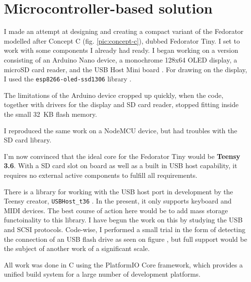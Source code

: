 \chapter{Microcontroller-based solution}
    
    I made an attempt at designing and creating a compact variant of the Fedorator modelled after Concept C  (fig. \ref{pic:concept-c}), dubbed Fedorator Tiny.  I set to work with some components I already had ready.  I began working on a version consisting of an Arduino Nano device, a monochrome 128x64 OLED display, a microSD card reader, and the USB Host Mini board \cite{usb-host-shield}.  For drawing on the display, I used the \texttt{esp8266-oled-ssd1306} library \cite{esp8266-oled-ssd1306}.
    
    The limitations of the Arduino device cropped up quickly, when the code, together with drivers for the display and SD card reader, stopped fitting inside the small 32~KB flash memory.
    
    I reproduced the same work on a NodeMCU device, but had troubles with the SD card library.
    
    I'm now convinced that the ideal core for the Fedorator Tiny would be \textbf{Teensy 3.6}.  With a SD card slot on board as well as a built in USB host capability, it requires no external active components to fulfill all requirements.
    
    There is a library for working with the USB host port in development by the Teensy creator, \texttt{USBHost\_t36} \cite{usbhost_t36}.  In the present, it only supports keyboard and MIDI devices.  The best course of action here would be to add mass storage functoinality to this library.  I have begun the work on this by studying the USB and SCSI protocols.  Code-wise, I performed a small trial in the form of detecting the connection of an USB flash drive as seen on figure \todo{}, but full support would be the subject of another work of a significant scale.
    
    All work was done in C using the PlatformIO Core framework, which provides a unified build system for a large number of development platforms\cite{platformio-core}.
    
    
